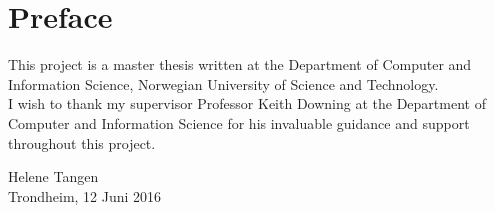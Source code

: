 \section*{Preface}


\noindent This project is a master thesis written at the Department of Computer and Information Science, Norwegian University of Science and Technology.\\

\noindent I wish to thank my supervisor Professor Keith Downing at the Department of Computer and Information Science for his invaluable guidance and support throughout this project.\\

\vfill

\begin{flushright}
Helene Tangen\\
Trondheim, 12 Juni 2016
\end{flushright}